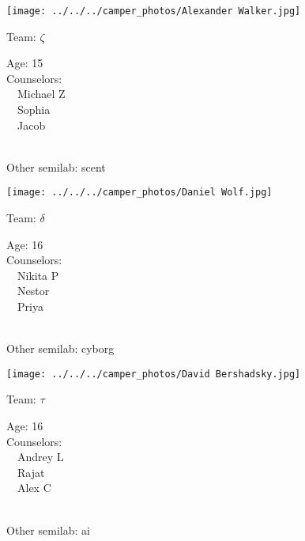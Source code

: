 \documentclass[10pt,letterpaper, landscape]{article}
\begin{document}
\horizontalshiftfornextsticker
\renewcommand{\baselinestretch}{1} \begin{sticker}
\noindent\begin{minipage}{0.5\textwidth}\texttt{[image: ../../../camper\_photos/Alexander Walker.jpg]}\end{minipage}\begin{minipage}{0.45\textwidth}
Team: {\Large $\zeta$}

Age:        15\\
Counselors: \\\ \ Michael Z\\\ \ Sophia\\\ \ Jacob\\
\end{minipage} \\ \vspace{0.07in}
Other semilab: scent
\end{sticker}
\horizontalshiftfornextsticker
\renewcommand{\baselinestretch}{1} \begin{sticker}
\noindent\begin{minipage}{0.5\textwidth}\texttt{[image: ../../../camper\_photos/Daniel Wolf.jpg]}\end{minipage}\begin{minipage}{0.45\textwidth}
Team: {\Large $\delta$}

Age:        16\\
Counselors: \\\ \ Nikita P\\\ \ Nestor\\\ \ Priya\\
\end{minipage} \\ \vspace{0.07in}
Other semilab: cyborg
\end{sticker}
\horizontalshiftfornextsticker
\renewcommand{\baselinestretch}{1} \begin{sticker}
\noindent\begin{minipage}{0.5\textwidth}\texttt{[image: ../../../camper\_photos/David Bershadsky.jpg]}\end{minipage}\begin{minipage}{0.45\textwidth}
Team: {\Large $\tau$}

Age:        16\\
Counselors: \\\ \ Andrey L\\\ \ Rajat\\\ \ Alex C\\
\end{minipage} \\ \vspace{0.07in}
Other semilab: ai
\end{sticker}
\end{document}

